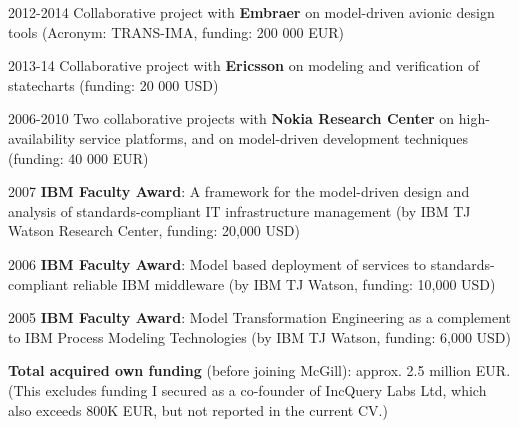 \begin{yearlist}
\item[2012-2014] Collaborative project with \textbf{Embraer} on model-driven avionic design tools (Acronym: TRANS-IMA, funding: 200 000 EUR) 
\item[2013-14] Collaborative project with \textbf{Ericsson} on modeling and verification of statecharts (funding: 20 000 USD)
\item[2006-2010] Two collaborative projects with \textbf{Nokia Research Center}
on high-availability service platforms, and on model-driven development techniques (funding: 40 000 EUR)
\item[2007] \textbf{IBM Faculty Award}: A framework for the model-driven design and analysis of standards-compliant IT infrastructure management (by IBM TJ Watson Research Center, funding: 20,000 USD)  
\item[2006] \textbf{IBM Faculty Award}: Model based deployment of services to standards-compliant reliable IBM middleware (by IBM TJ Watson, funding: 10,000 USD) 
\item[2005] \textbf{IBM Faculty Award}: Model Transformation Engineering as a complement to IBM Process Modeling Technologies (by IBM TJ Watson, funding: 6,000 USD)  
\end{yearlist}



\textbf{Total acquired own funding} (before joining McGill): approx. 2.5 million EUR. 
(This excludes funding I secured as a co-founder of IncQuery Labs Ltd, which also exceeds 800K EUR, but not reported in the current CV.)



